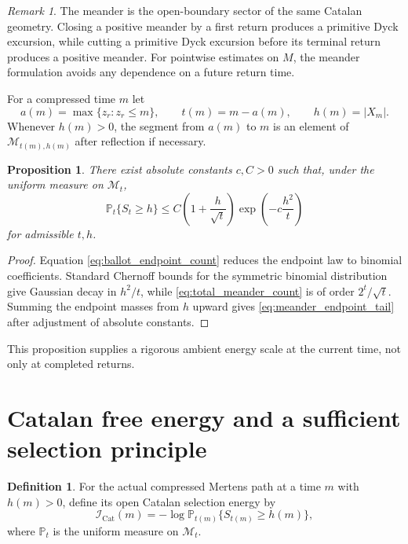 \documentclass[11pt]{amsart}
\numberwithin{equation}{section}
\theoremstyle{plain}
\newtheorem{proposition}[theorem]{Proposition}
\theoremstyle{definition}
\newtheorem{definition}[theorem]{Definition}
\theoremstyle{remark}
\newtheorem{remark}[theorem]{Remark}
\newcommand{\Mert}{M}
\newcommand{\Pp}{\mathbb{P}}
\newcommand{\Icat}{\mathcal{I}_{\mathrm{Cat}}}
\begin{document}
\begin{remark}
\label{rem:meander_as_open_catalan}
The meander is the open-boundary sector of the same Catalan geometry.  Closing a positive meander by a first return produces a primitive Dyck excursion, while cutting a primitive Dyck excursion before its terminal return produces a positive meander.  For pointwise estimates on $\Mert$, the meander formulation avoids any dependence on a future return time.
\end{remark}

For a compressed time $m$ let
\begin{equation}
a(m)=\max\{z_r:z_r\le m\},
\qquad
t(m)=m-a(m),
\qquad
h(m)=|X_m|.
\label{eq:last_zero_coordinates}
\end{equation}
Whenever $h(m)>0$, the segment from $a(m)$ to $m$ is an element of $\mathcal{M}_{t(m),h(m)}$ after reflection if necessary.

\begin{proposition}
\label{prop:meander_gaussian_tail}
There exist absolute constants $c,C>0$ such that, under the uniform measure on $\mathcal{M}_t$,
\begin{equation}
\Pp_t\{S_t\ge h\}
\le
C\left(1+\frac{h}{\sqrt t}\right)
\exp\!\left(-c\frac{h^2}{t}\right)
\label{eq:meander_endpoint_tail}
\end{equation}
for admissible $t,h$.
\end{proposition}

\begin{proof}
Equation \eqref{eq:ballot_endpoint_count} reduces the endpoint law to binomial coefficients.  Standard Chernoff bounds for the symmetric binomial distribution give Gaussian decay in $h^2/t$, while \eqref{eq:total_meander_count} is of order $2^t/\sqrt t$.  Summing the endpoint masses from $h$ upward gives \eqref{eq:meander_endpoint_tail} after adjustment of absolute constants.
\end{proof}

This proposition supplies a rigorous ambient energy scale at the current time, not only at completed returns.

\section{Catalan free energy and a sufficient selection principle}
\label{sec:catalan_free_energy}

\begin{definition}
\label{def:meander_selection_energy}
For the actual compressed Mertens path at a time $m$ with $h(m)>0$, define its open Catalan selection energy by
\begin{equation}
\Icat(m)
=
-\log
\Pp_{t(m)}\{S_{t(m)}\ge h(m)\},
\label{eq:selection_energy_definition}
\end{equation}
where $\Pp_t$ is the uniform measure on $\mathcal{M}_t$.
\end{definition}
\end{document}
